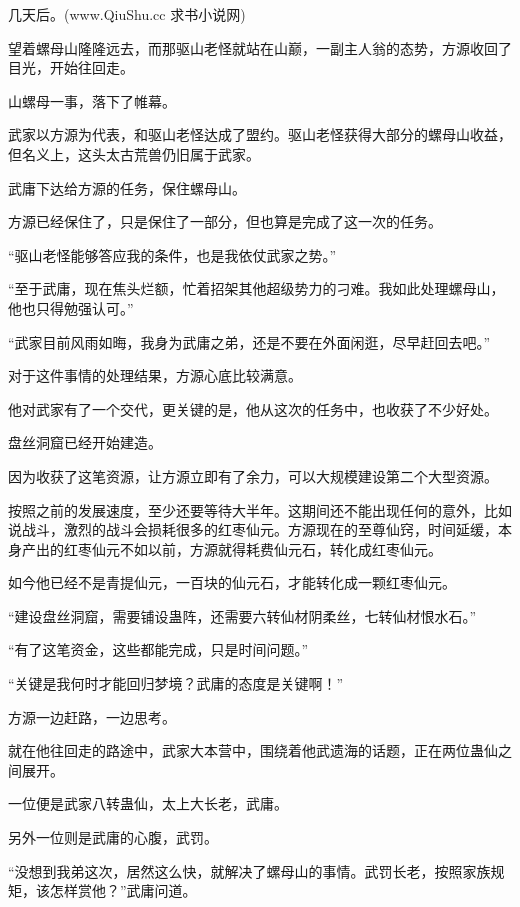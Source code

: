 
\begin{this_body}

几天后。(www.QiuShu.cc 求书小说网)

望着螺母山隆隆远去，而那驱山老怪就站在山巅，一副主人翁的态势，方源收回了目光，开始往回走。

山螺母一事，落下了帷幕。

武家以方源为代表，和驱山老怪达成了盟约。驱山老怪获得大部分的螺母山收益，但名义上，这头太古荒兽仍旧属于武家。

武庸下达给方源的任务，保住螺母山。

方源已经保住了，只是保住了一部分，但也算是完成了这一次的任务。

“驱山老怪能够答应我的条件，也是我依仗武家之势。”

“至于武庸，现在焦头烂额，忙着招架其他超级势力的刁难。我如此处理螺母山，他也只得勉强认可。”

“武家目前风雨如晦，我身为武庸之弟，还是不要在外面闲逛，尽早赶回去吧。”

对于这件事情的处理结果，方源心底比较满意。

他对武家有了一个交代，更关键的是，他从这次的任务中，也收获了不少好处。

盘丝洞窟已经开始建造。

因为收获了这笔资源，让方源立即有了余力，可以大规模建设第二个大型资源。

按照之前的发展速度，至少还要等待大半年。这期间还不能出现任何的意外，比如说战斗，激烈的战斗会损耗很多的红枣仙元。方源现在的至尊仙窍，时间延缓，本身产出的红枣仙元不如以前，方源就得耗费仙元石，转化成红枣仙元。

如今他已经不是青提仙元，一百块的仙元石，才能转化成一颗红枣仙元。

“建设盘丝洞窟，需要铺设蛊阵，还需要六转仙材阴柔丝，七转仙材恨水石。”

“有了这笔资金，这些都能完成，只是时间问题。”

“关键是我何时才能回归梦境？武庸的态度是关键啊！”

方源一边赶路，一边思考。

就在他往回走的路途中，武家大本营中，围绕着他武遗海的话题，正在两位蛊仙之间展开。

一位便是武家八转蛊仙，太上大长老，武庸。

另外一位则是武庸的心腹，武罚。

“没想到我弟这次，居然这么快，就解决了螺母山的事情。武罚长老，按照家族规矩，该怎样赏他？”武庸问道。


\end{this_body}
